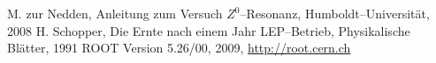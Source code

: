 \renewcommand{\refname}{Literatur und Programme}
\begin{thebibliography}{xxxxxx}
M. zur Nedden, Anleitung zum Versuch $Z^0$–Resonanz, Humboldt–Universität, 2008
H. Schopper, Die Ernte nach einem Jahr LEP–Betrieb, Physikalische Blätter, 1991
ROOT Version 5.26/00, 2009, \href{http://root.cern.ch}{http://root.cern.ch}
\end{thebibliography}